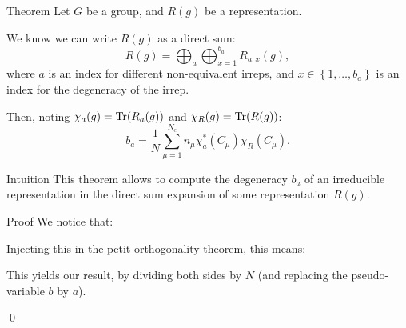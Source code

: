 \documentclass[a4paper]{article}
\begin{document}
\begin{parag}{Theorem}
    Let $G$ be a group, and $R\left(g\right)$ be a representation.

    We know we can write $R\left(g\right)$ as a direct sum: 
    \[R\left(g\right) = \bigoplus_{a} \bigoplus_{x=1}^{b_a} R_{a, x}\left(g\right),\]
    where $a$ is an index for different non-equivalent irreps, and $x \in \left\{1, \ldots, b_a\right\}$ is an index for the degeneracy of the irrep.

    Then, noting $\chi_a\left(g\right) = \Tr\left(R_a\left(g\right)\right)$ and $\chi_R\left(g\right) = \Tr\left(R\left(g\right)\right)$:
    \[b_a = \frac{1}{N}\sum_{\mu=1}^{N_c} n_{\mu} \chi_a^*\left(C_{\mu}\right) \chi_R\left(C_{\mu}\right).\]
    
    \begin{subparag}{Intuition}
        This theorem allows to compute the degeneracy $b_a$ of an irreducible representation in the direct sum expansion of some representation $R\left(g\right)$.
    \end{subparag}

    \begin{subparag}{Proof}
        We notice that:

        Injecting this in the petit orthogonality theorem, this means: 

        This yields our result, by dividing both sides by $N$ (and replacing the pseudo-variable $b$ by $a$).

        \qed
    \end{subparag}
\end{parag}
\end{document}
